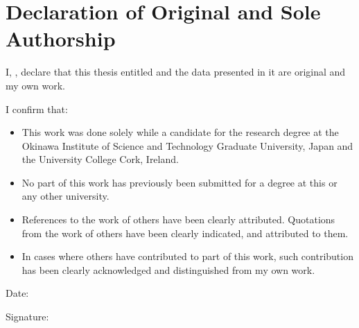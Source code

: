 \chapter*{Declaration of Original and Sole Authorship}

I, \name, declare that this thesis entitled \emph{\thesistitle} and the data presented in it are original and my own work.


I confirm that:
\begin{itemize}
\item This work was done solely while a candidate for the research degree at the Okinawa Institute of Science and Technology Graduate University, Japan and the University College Cork, Ireland.
\item No part of this work has previously been submitted for a degree at this or any other university.
\item References to the work of others have been clearly attributed. Quotations from the work of others have been clearly indicated, and attributed to them.
\item In cases where others have contributed to part of this work, such contribution has been clearly acknowledged and distinguished from my own work.
\end{itemize}

Date:  \submissiondate

Signature:
